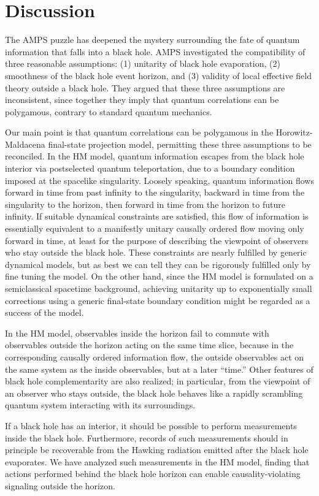 \documentclass[11pt]{article}
\begin{document}
\section{Discussion}
The AMPS puzzle has deepened the mystery surrounding the fate of quantum information that falls into a black hole. AMPS investigated the compatibility of three reasonable assumptions: (1) unitarity of black hole evaporation, (2) smoothness of the black hole event horizon, and (3) validity of local effective field theory outside a black hole. They argued that these three assumptions are inconsistent, since together they imply that quantum correlations can be polygamous, contrary to standard quantum mechanics. 

Our main point is that quantum correlations can be polygamous in the Horowitz-Maldacena final-state projection model, permitting these three assumptions to be reconciled. In the HM model, quantum information escapes from the black hole interior via postselected quantum teleportation, due to a boundary condition imposed at the spacelike singularity. Loosely speaking, quantum information flows forward in time from past infinity to the singularity, backward in time from the singularity to the horizon, then forward in time from the horizon to future infinity. If suitable dynamical constraints are satisfied, this flow of information is essentially equivalent to a manifestly unitary causally ordered flow moving only forward in time, at least for the purpose of describing the viewpoint of observers who stay outside the black hole. These constraints are nearly fulfilled by generic dynamical models, but as best we can tell they can be rigorously fulfilled only by fine tuning the model. On the other hand, since the HM model is formulated on a semiclassical spacetime background, achieving unitarity up to exponentially small corrections using a generic final-state boundary condition might be regarded as a success of the model.

In the HM model, observables inside the horizon fail to commute with observables outside the horizon acting on the same time slice, because in the corresponding causally ordered information flow, the outside observables act on the same system as the inside observables, but at a later ``time.'' Other features of black hole complementarity are also realized; in particular, from the viewpoint of an observer who stays outside, the black hole behaves like a rapidly scrambling quantum system interacting with its surroundings. 

If a black hole has an interior, it should be possible to perform measurements inside the black hole. Furthermore, records of such measurements should in principle be recoverable from the Hawking radiation emitted after the black hole evaporates. We have analyzed such measurements in the HM model, finding that actions performed behind the black hole horizon can enable causality-violating signaling outside the horizon. 
\end{document}
